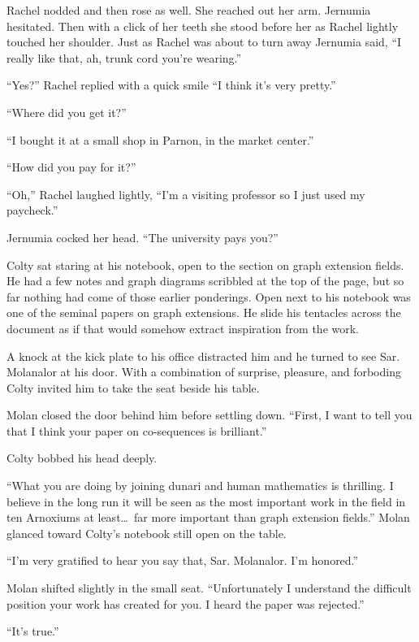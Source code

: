 Rachel nodded and then rose as well. She reached out her arm. Jernumia hesitated. Then with a
click of her teeth she stood before her as Rachel lightly touched her shoulder. Just as Rachel
was about to turn away Jernumia said, ``I really like that, ah, trunk cord you're wearing.''

``Yes?'' Rachel replied with a quick smile ``I think it's very pretty.''

``Where did you get it?''

``I bought it at a small shop in Parnon, in the market center.''

``How did you pay for it?''

``Oh,'' Rachel laughed lightly, ``I'm a visiting professor so I just used my paycheck.''

Jernumia cocked her head. ``The university pays you?'' 

\spacebreak

Colty sat staring at his notebook, open to the section on graph extension fields. He had a few
notes and graph diagrams scribbled at the top of the page, but so far nothing had come of those
earlier ponderings.  Open next to his notebook was one of the seminal papers on graph
extensions. He slide his tentacles across the document as if that would somehow extract
inspiration from the work.

A knock at the kick plate to his office distracted him and he turned to see Sar. Molanalor at
his door. With a combination of surprise, pleasure, and forboding Colty invited him to take the
seat beside his table.

Molan closed the door behind him before settling down. ``First, I want to tell you that I think
your paper on co-sequences is brilliant.''

Colty bobbed his head deeply.

``What you are doing by joining dunari and human mathematics is thrilling. I believe in the long
run it will be seen as the most important work in the field in ten Arnoxiums at least\ldots\
far more important than graph extension fields.'' Molan glanced toward Colty's notebook still
open on the table.

``I'm very gratified to hear you say that, Sar. Molanalor. I'm honored.''

Molan shifted slightly in the small seat. ``Unfortunately I understand the difficult position
your work has created for you. I heard the paper was rejected.''

``It's true.''

